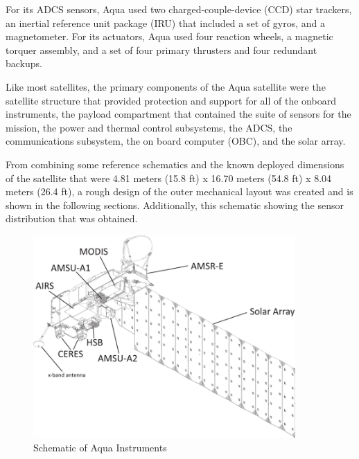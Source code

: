 \cite{aqua}For its ADCS sensors, Aqua used two charged-couple-device (CCD) star trackers, an inertial reference unit package (IRU) that included a set of gyros, and a magnetometer. For its actuators, Aqua used four reaction wheels, a magnetic torquer assembly, and a set of four primary thrusters and four redundant backups. \cite{aqua_acds}

Like most satellites, the primary components of the Aqua satellite were the satellite structure that provided protection and support for all of the onboard instruments, the payload compartment that contained the suite of sensors for the mission, the power and thermal control subsystems, the ADCS, the communications subsystem, the on board computer (OBC), and the solar array. \cite{aqua_health_summary}

From combining some reference schematics and the known deployed dimensions of the satellite that were 4.81 meters (15.8 ft) x 16.70 meters (54.8 ft) x 8.04 meters (26.4 ft), a rough design of the outer mechanical layout was created and is shown in the following sections. \cite{aqua_mass_sumaries} Additionally, this schematic showing the sensor distribution that was obtained.

\begin{figure}[H]
    \centering
    \includegraphics[width = 10cm]{Images/Schematic-of-the-Aqua-spacecraft-its-six-Earth-observing-instruments-12-panel-solar.png}
    \caption{Schematic of Aqua Instruments}
    \label{fig:squa-schematic}
\end{figure}

